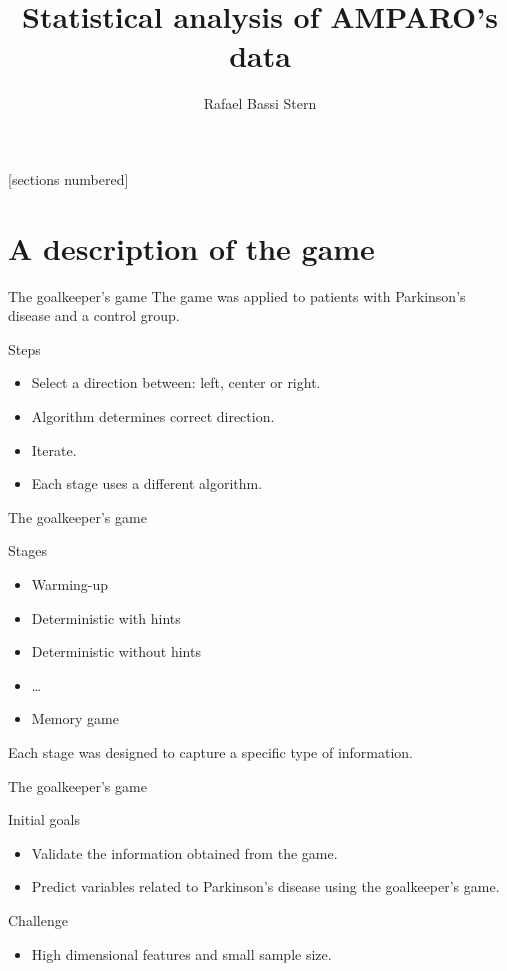 \documentclass[10pt]{beamer}
\title{Statistical analysis of AMPARO's data}
\date{}
\author{Rafael Bassi Stern}
\institute{Federal University of São Carlos}
\begin{document}
\maketitle

\begin{frame}{}
 [sections numbered]
 \tableofcontents[hideallsubsections]
\end{frame}

\section{A description of the game}

\begin{frame}{The goalkeeper's game}
 The game was applied to patients with 
 Parkinson's disease and
 a control group.
 \begin{exampleblock}{Steps}
  \begin{itemize}
   \item Select a direction between: left, center or right.
	 \item Algorithm determines correct direction.
 	 \item Iterate.
 	\item Each stage uses a different algorithm.
  \end{itemize}
 \end{exampleblock}
\end{frame}

\begin{frame}{The goalkeeper's game}
 \begin{exampleblock}{Stages}
  \begin{itemize} 
   \item Warming-up
	 \item Deterministic with hints
	 \item Deterministic without hints
	 \item \ldots
	 \item Memory game
  \end{itemize}
 \end{exampleblock}
 Each stage was designed to capture
 a specific type of information.
\end{frame}

\begin{frame}{The goalkeeper's game}
 \begin{alertblock}{Initial goals}
  \begin{itemize} 
   \item Validate the information obtained from the game.
	 \item Predict variables related to Parkinson's disease
	 using the goalkeeper's game.
  \end{itemize}
 \end{alertblock}
 \begin{alertblock}{Challenge}
  \begin{itemize} 
   \item High dimensional features and small sample size.
  \end{itemize}
 \end{alertblock}
\end{frame}
\end{document}
